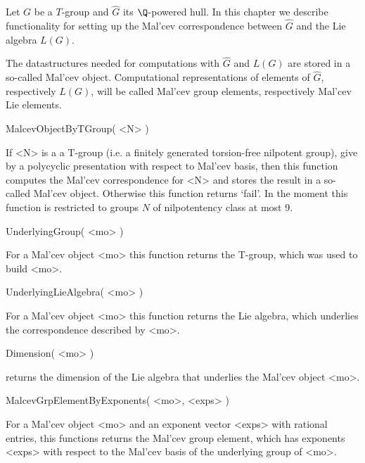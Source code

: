 


Let $G$ be a $T$-group
and $\hat{G}$ its $\Q$-powered hull.
In this chapter we describe functionality 
for setting up the 
Mal'cev correspondence
between $\hat{G}$ and the Lie algebra $L(G)$.

The datastructures needed for computations with $\hat{G}$ and 
$L(G)$ are 
stored in a so-called Mal'cev object.
Computational representations of 
elements of $\hat{G}$, respectively $L(G)$, 
will be called Mal'cev group elements, respectively 
Mal'cev Lie elements.

\> MalcevObjectByTGroup( <N> )

If <N> is a a T-group 
(i.e. a finitely generated torsion-free nilpotent group),
give by a polycyclic presentation with respect to Mal'cev basis,
then this function computes the Mal'cev correspondence for <N> 
and stores the result in a so-called Mal'cev object. 
Otherwise this function returns `fail'.
In the moment this function is restricted to groups $N$
of nilpotentency class at most 9.

\> UnderlyingGroup( <mo> )

For a Mal'cev object <mo> this function returns the T-group,
which was used to build <mo>.

\> UnderlyingLieAlgebra( <mo> )

For a Mal'cev object <mo> this function returns the Lie algebra,
which underlies the correspondence described by <mo>.

\> Dimension( <mo> )

returns the dimension of the Lie algebra that underlies the Mal'cev object <mo>.

\> MalcevGrpElementByExponents( <mo>, <exps> )

For a Mal'cev object <mo> and an exponent vector <exps> with rational 
entries, this functions returns the Mal'cev group element, which 
has exponents <exps> with respect to the Mal'cev basis of the underlying
group of <mo>.


